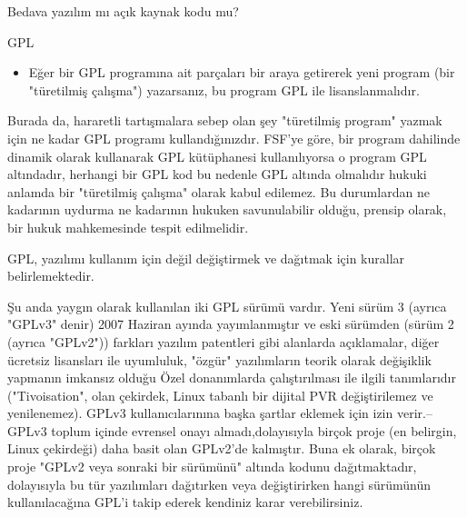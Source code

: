 \begin{section}{Bedava yazılım mı açık kaynak kodu mu?}
\begin{subsection}{GPL}
\begin{itemize}
Bu bağlamda "Kaynak kodu" almak demek yazılımı bilgisayarda çalıştırmak için gereken her şeyi almak demektir. Özel durumlar ne demektir-- örneğin kapalı bir bilgisayardaki değiştirilmiş Linux çekirdeğini uygun bir şekilde başlatmak için şifreleme anahtarları gerekebilir--bu hararetli bir tartışma konusudur.

Eğer biri para ile GPL yazılım satın alırsa, doğal olarak sadece bütün bilgisayarlarında çalıştırma hakkına sahiptir, kopyalayamaz ve yeniden satamaz.(GPL lisansı altında).Bunun bir sonucu olarak da "koltuk başına" GPL yazılım satmak  mantıklı bir iş değildir, bu durumun önemli bir sonucu olarakta fiyatlar açısından rahatlık sağlamasıdır bu sebeple Linux dağıtımları kullanmak mantıklıdır.

 \item Eğer bir GPL programına ait parçaları bir araya getirerek yeni program (bir "türetilmiş çalışma") yazarsanız, bu program GPL ile lisanslanmalıdır.
\end{itemize}

Burada da, hararetli tartışmalara sebep olan şey "türetilmiş program" yazmak için ne kadar GPL programı kullandığınızdır. FSF'ye göre, bir program dahilinde dinamik olarak kullanarak GPL kütüphanesi kullanılıyorsa o program GPL altındadır, herhangi bir GPL kod  bu nedenle GPL altında olmalıdır hukuki anlamda bir "türetilmiş çalışma" olarak kabul edilemez. Bu durumlardan ne kadarının uydurma ne kadarının hukuken savunulabilir olduğu, prensip olarak, bir hukuk mahkemesinde tespit edilmelidir.

GPL, yazılımı kullanım için değil değiştirmek ve dağıtmak için kurallar belirlemektedir.

Şu anda  yaygın olarak kullanılan  iki GPL sürümü vardır. Yeni sürüm 3 (ayrıca "GPLv3" denir) 2007 Haziran ayında yayımlanmıştır ve eski sürümden (sürüm 2 (ayrıca "GPLv2")) farkları yazılım patentleri gibi alanlarda açıklamalar, diğer ücretsiz lisansları ile uyumluluk, "özgür" yazılımların teorik olarak değişiklik yapmanın imkansız olduğu Özel donanımlarda çalıştırılması ile ilgili tanımlarıdır ("Tivoisation", olan çekirdek, Linux tabanlı bir dijital PVR değiştirilemez ve yenilenemez). GPLv3 kullanıcılarınına başka şartlar eklemek için izin verir.--GPLv3 toplum içinde evrensel onayı almadı,dolayısıyla birçok proje (en belirgin, Linux çekirdeği) daha basit  olan GPLv2'de kalmıştır. Buna ek olarak, birçok proje "GPLv2 veya sonraki bir sürümünü" altında kodunu dağıtmaktadır, dolayısıyla bu tür yazılımları dağıtırken veya değiştirirken hangi sürümünün kullanılacağına GPL'i takip ederek kendiniz karar verebilirsiniz.


\end{subsection}
\end{section}
